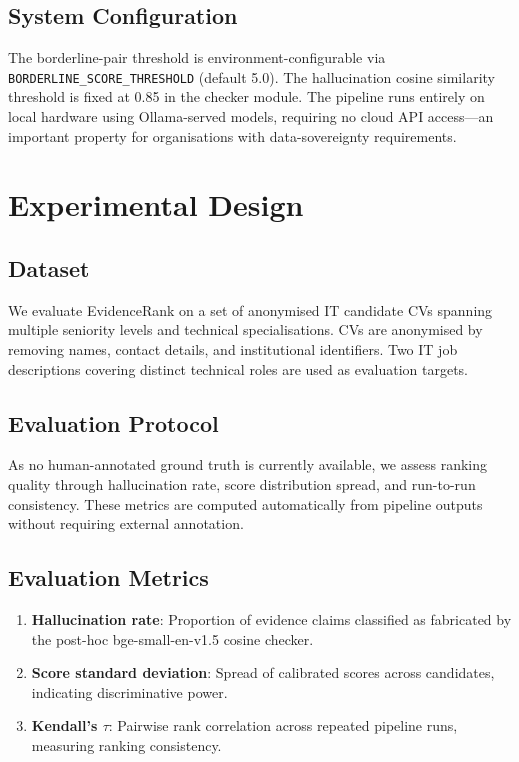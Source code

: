 \documentclass[journal]{IEEEtran}
\begin{document}
\subsection{System Configuration}

The borderline-pair threshold is environment-configurable via
\texttt{BORDERLINE\_SCORE\_THRESHOLD} (default 5.0). The hallucination cosine similarity threshold is fixed at 0.85 in the checker module. The pipeline runs entirely
on local hardware using Ollama-served models, requiring no cloud API
access—an important property for organisations with data-sovereignty requirements.


\section{Experimental Design}
\label{sec:experiment}

\subsection{Dataset}

We evaluate EvidenceRank on a set of anonymised IT candidate CVs spanning
multiple seniority levels and technical specialisations. CVs are anonymised by
removing names, contact details, and institutional identifiers. Two IT job
descriptions covering distinct technical roles are used as evaluation targets.

\subsection{Evaluation Protocol}

As no human-annotated ground truth is currently available, we assess ranking
quality through hallucination rate, score distribution spread, and run-to-run
consistency. These metrics are computed automatically from pipeline outputs without
requiring external annotation.

\subsection{Evaluation Metrics}

\begin{enumerate}
  \item \textbf{Hallucination rate}: Proportion of evidence claims classified as
        fabricated by the post-hoc bge-small-en-v1.5 cosine checker.
  \item \textbf{Score standard deviation}: Spread of calibrated scores across
        candidates, indicating discriminative power.
  \item \textbf{Kendall's $\tau$}: Pairwise rank correlation across repeated
        pipeline runs, measuring ranking consistency.
\end{enumerate}
\end{document}
